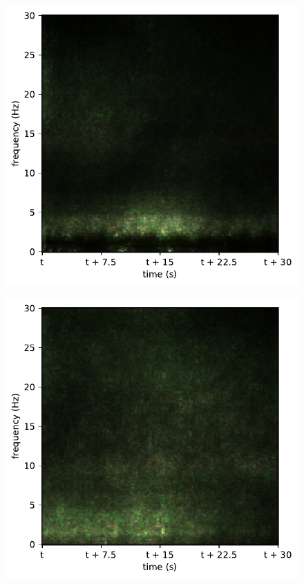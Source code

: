 \begin{subfigure}{.16\textwidth}
  \centering
  \includegraphics[width=1\linewidth]{./pics/class_rnn_4}
  \caption{}
  \label{fig_1_35}
\end{subfigure}%
\begin{subfigure}{.16\textwidth}
  \centering
  \includegraphics[width=1\linewidth]{./pics/class_rnn_5}
  \caption{}
  \label{fig_1_36}
\end{subfigure}
